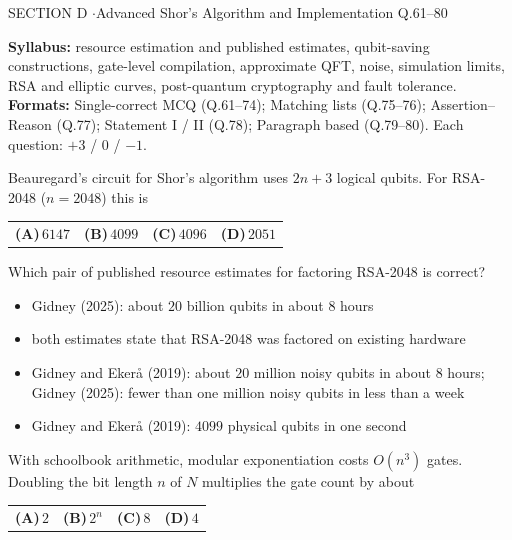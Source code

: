 \documentclass[11pt,a4paper]{article}
\newcommand{\optlabel}[1]{\textbf{(#1)}}
\newenvironment{qitem}[1]{\begin{list}{}{\setlength{\leftmargin}{3.3em}\setlength{\labelwidth}{3.1em}%
  \setlength{\labelsep}{0.2em}\setlength{\topsep}{3pt}\setlength{\parsep}{3pt}}\item[\textbf{Q.#1}\hfill]}{\end{list}}
\newcommand{\qsep}{\par\vspace{2pt}{\color{black!15}\hrule}\vspace{4pt}}
\begin{document}
\newpage

\begin{sectionbanner}SECTION D \enspace$\cdot$\enspace Advanced Shor's Algorithm and Implementation \hfill Q.61--80\end{sectionbanner}

{\small \textbf{Syllabus:} resource estimation and published estimates, qubit-saving constructions, gate-level compilation, approximate QFT, noise, simulation limits, RSA and elliptic curves, post-quantum cryptography and fault tolerance.\\ \textbf{Formats:} Single-correct MCQ (Q.61--74); Matching lists (Q.75--76); Assertion--Reason (Q.77); Statement I / II (Q.78); Paragraph based (Q.79--80). Each question: $+3$ / $0$ / $-1$.}
\par\medskip

\begin{qitem}{61}
Beauregard's circuit for Shor's algorithm uses $2n + 3$ logical qubits. For RSA-2048 ($n = 2048$) this is
\par\smallskip\noindent\begin{tabularx}{\linewidth}{@{}*{4}{L}@{}}
\optlabel{A}\,$6147$ & \optlabel{B}\,$4099$ & \optlabel{C}\,$4096$ & \optlabel{D}\,$2051$
\end{tabularx}
\end{qitem}
\qsep

\begin{qitem}{62}
Which pair of published resource estimates for factoring RSA-2048 is correct?
\begin{itemize}[leftmargin=2.6em, labelsep=0.4em, itemsep=2pt, topsep=3pt]
\item[\optlabel{A}] Gidney (2025): about $20$ billion qubits in about $8$ hours
\item[\optlabel{B}] both estimates state that RSA-2048 was factored on existing hardware
\item[\optlabel{C}] Gidney and Ekerå (2019): about $20$ million noisy qubits in about $8$ hours; Gidney (2025): fewer than one million noisy qubits in less than a week
\item[\optlabel{D}] Gidney and Ekerå (2019): $4099$ physical qubits in one second
\end{itemize}
\end{qitem}
\qsep

\begin{qitem}{63}
With schoolbook arithmetic, modular exponentiation costs $O(n^3)$ gates. Doubling the bit length $n$ of $N$ multiplies the gate count by about
\par\smallskip\noindent\begin{tabularx}{\linewidth}{@{}*{4}{L}@{}}
\optlabel{A}\,$2$ & \optlabel{B}\,$2^{n}$ & \optlabel{C}\,$8$ & \optlabel{D}\,$4$
\end{tabularx}
\end{qitem}
\qsep
\end{document}

